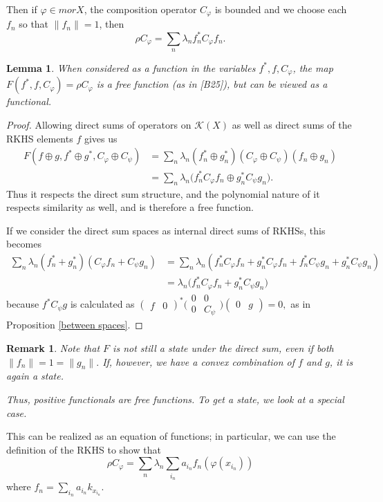 \documentclass[12pt]{amsart}
\newtheorem{lemma}[theorem]{Lemma}
\newtheorem{remark}{Remark}[theorem]
\theoremstyle{definition}
\numberwithin{equation}{section}
\newcommand{\m}[1]{\bigl(\begin{smallmatrix}#1\end{smallmatrix}\bigr)}
\newcommand{\M}[1]{\begin{pmatrix}#1\end{pmatrix}}
\begin{document}
Then if $\varphi \in morX$, the composition operator $C_\varphi$ is bounded and we choose each $f_n$ so that $\|f_n\|=1$, then  
\begin{equation}
     \rho C_\varphi = \sum_n\lambda_nf_n^*C_\varphi f_n.
\end{equation}
\begin{lemma}
    When considered as a function in the variables $f^*, f, C_\varphi$, the map $F(f^*, f, C_\varphi) = \rho C_\varphi$ is a free function (as in [B25]), but can be viewed as a functional. 
\end{lemma}
\begin{proof}
    Allowing direct sums of operators on $\mathcal K(X)$ as well as direct sums of the RKHS elements $f$ gives us \[\begin{split}
    F(f\oplus g, f^* \oplus g^*, C_\varphi \oplus C_\psi) &= \sum_n\lambda_n(f_n^*\oplus g^*_n)(C_\varphi \oplus C_\psi)( f_n\oplus g_n)\\&= \sum_n\lambda_n\biggl(f_n^*C_\varphi f_n\oplus g_n^*C_\psi g_n\biggr).
\end{split}\] Thus it respects the direct sum structure, and the polynomial nature of it respects similarity as well, and is therefore a free function.

If we consider the direct sum spaces as internal direct sums of RKHSs, this becomes \[\begin{split}
    \sum_n \lambda_n (f^*_n+g^*_n)(C_\varphi f_n+C_\psi g_n) &=  \sum_n\lambda_n(f^*_nC_\varphi f_n + g^*_nC_\varphi f_n + f^*_nC_\psi g_n + g^*_nC_\psi g_n)\\ &= \lambda_n\biggl(f_n^*C_\varphi f_n+ g_n^*C_\psi g_n\biggr)
\end{split}\] 
because $f^*C_\psi g$ is calculated as $\M{f&0}^*\m{0 &0\\0&C_\psi}\M{0 & g} =0,$ as in Proposition \ref{between spaces}.
\end{proof} \begin{remark}
    Note that $F$ is not still a state under the direct sum, even if both $\|f_n\|=1=\|g_n\|.$ If, however, we have a convex combination of $f$ and $g$, it is again a state. 

    Thus, positive functionals are free functions. To get a state, we look at a special case. 
\end{remark}

This can be realized as an equation of functions; in particular, we can use the definition of the RKHS to show that \begin{equation}
    \rho C_\varphi = \sum_n\lambda_n\sum_{{i_n}}a_{i_n}f_n({\varphi(x_{i_n})})
\end{equation}
where $f_n = \sum_{i_n}a_{i_n}k_{x_{i_n}}.$ 
\end{document}
